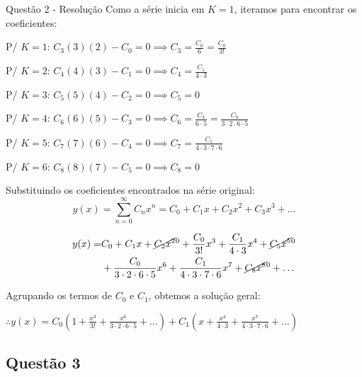 \documentclass[8pt,aspectratio = 169]{beamer}
\begin{document}
\begin{frame}[allowframebreaks]{Questão 2 - Resolução}
    Como a série inicia em $K=1$, iteramos para encontrar os coeficientes:

    \vspace{0.3cm}
    \noindent P/ $K=1$: \quad $C_3 (3)(2) - C_0 = 0 \implies C_3 = \frac{C_0}{6} = \frac{C_0}{3!}$ 

    \noindent P/ $K=2$: \quad $C_4 (4)(3) - C_1 = 0 \implies C_4 = \frac{C_1}{4 \cdot 3}$ 

    \noindent P/ $K=3$: \quad $C_5 (5)(4) - C_2 = 0 \implies C_5 = 0$ 

    \noindent P/ $K=4$: \quad $C_6 (6)(5) - C_3 = 0 \implies C_6 = \frac{C_3}{6 \cdot 5} = \frac{C_0}{3 \cdot 2 \cdot 6 \cdot 5}$ 

    \noindent P/ $K=5$: \quad $C_7 (7)(6) - C_4 = 0 \implies C_7 = \frac{C_1}{4 \cdot 3 \cdot 7 \cdot 6}$ 

    \noindent P/ $K=6$: \quad $C_8 (8)(7) - C_5 = 0 \implies C_8 = 0$ 

    \framebreak 

    Substituindo os coeficientes encontrados na série original:
    \[ y(x) = \sum_{n=0}^{\infty} C_n x^n = C_0 + C_1 x + C_2 x^2 + C_3 x^3 + \dots \]

    \begin{align*}
        y(x) = & C_0 + C_1 x + \cancel{C_2 x^2}^0 + \frac{C_0}{3!} x^3 + \frac{C_1}{4 \cdot 3} x^4 + \cancel{C_5 x^5}^0 \\
        & + \frac{C_0}{3 \cdot 2 \cdot 6 \cdot 5} x^6 + \frac{C_1}{4 \cdot 3 \cdot 7 \cdot 6} x^7 + \cancel{C_8 x^8}^0 + \dots
    \end{align*}

    Agrupando os termos de $C_0$ e $C_1$, obtemos a solução geral:
    \begin{center}
        $\displaystyle \therefore y(x) = C_0 \left( 1 + \frac{x^3}{3!} + \frac{x^6}{3 \cdot 2 \cdot 6 \cdot 5} + \dots \right) + C_1 \left( x + \frac{x^4}{4 \cdot 3} + \frac{x^7}{4 \cdot 3 \cdot 7 \cdot 6} + \dots \right)$    
    \end{center}

\end{frame}

\subsection{Questão 3}
\end{document}
